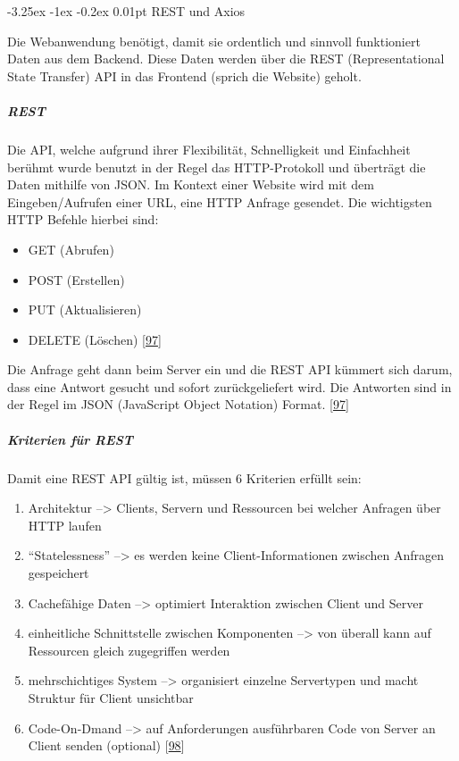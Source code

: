 \documentclass[
    headings=optiontotocandhead,%
    twoside,
    numbers=noenddot,%
    12pt, %
    titlepage, %
    parskip=full, %
    listof=leveldown, 
    numbers=noenddot, %
    a4paper,DIV=14,
    BCOR=15mm,
]{scrbook}
\makeatletter
\providecommand{\tightlist}{%
  \setlength{\itemsep}{0pt}\setlength{\parskip}{0pt}}
\renewcommand\paragraph{\@startsection{paragraph}{4}{\z@}%
    {-3.25ex \@plus -1ex \@minus -0.2ex}%
    {0.01pt}%
    {\raggedsection\normalfont\sectfont\nobreak\size@paragraph}%
  }
\makeatother
\begin{document}
\hypertarget{rest-und-axios}{%
\paragraph{REST und Axios}\label{rest-und-axios}}

Die Webanwendung benötigt, damit sie ordentlich und sinnvoll
funktioniert Daten aus dem Backend. Diese Daten werden über die REST
(Representational State Transfer) API in das Frontend (sprich die
Website) geholt.

\hypertarget{rest}{%
\subparagraph{REST}\label{rest}}

Die API, welche aufgrund ihrer Flexibilität, Schnelligkeit und
Einfachheit berühmt wurde benutzt in der Regel das HTTP-Protokoll und
überträgt die Daten mithilfe von JSON. Im Kontext einer Website wird mit
dem Eingeben/Aufrufen einer URL, eine HTTP Anfrage gesendet. Die
wichtigsten HTTP Befehle hierbei sind:

\begin{itemize}
\tightlist
\item
  GET (Abrufen)
\item
  POST (Erstellen)
\item
  PUT (Aktualisieren)
\item
  DELETE (Löschen) {[}\protect\hyperlink{ref-Talend-REST}{97}{]}
\end{itemize}

Die Anfrage geht dann beim Server ein und die REST API kümmert sich
darum, dass eine Antwort gesucht und sofort zurückgeliefert wird. Die
Antworten sind in der Regel im JSON (JavaScript Object Notation) Format.
{[}\protect\hyperlink{ref-Talend-REST}{97}{]}

\hypertarget{kriterien-fuxfcr-rest}{%
\subparagraph{Kriterien für REST}\label{kriterien-fuxfcr-rest}}

Damit eine REST API gültig ist, müssen 6 Kriterien erfüllt sein:

\begin{enumerate}
\def\labelenumi{\arabic{enumi}.}
\tightlist
\item
  Architektur --\textgreater{} Clients, Servern und Ressourcen bei
  welcher Anfragen über HTTP laufen
\item
  ``Statelessness'' --\textgreater{} es werden keine
  Client-Informationen zwischen Anfragen gespeichert
\item
  Cachefähige Daten --\textgreater{} optimiert Interaktion zwischen
  Client und Server
\item
  einheitliche Schnittstelle zwischen Komponenten --\textgreater{} von
  überall kann auf Ressourcen gleich zugegriffen werden
\item
  mehrschichtiges System --\textgreater{} organisiert einzelne
  Servertypen und macht Struktur für Client unsichtbar
\item
  Code-On-Dmand --\textgreater{} auf Anforderungen ausführbaren Code von
  Server an Client senden (optional)
  {[}\protect\hyperlink{ref-RedHat-REST}{98}{]}
\end{enumerate}
\end{document}
